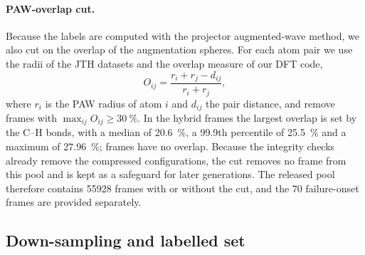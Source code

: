 \paragraph{PAW-overlap cut.} Because the labels are computed with the projector augmented-wave
method,\cite{Blochl1994PAW} we also cut on the overlap of the augmentation spheres. For each atom pair
we use the radii of the JTH datasets\cite{Jollet2014CPC} and the overlap measure of our DFT code,
\begin{equation}
  O_{ij} = \frac{r_i + r_j - d_{ij}}{r_i + r_j},
\end{equation}
where $r_i$ is the PAW radius of atom $i$ and $d_{ij}$ the pair distance, and remove frames with
$\max_{ij}O_{ij} \geq \SI{30}{\percent}$. In the hybrid frames the largest overlap is set by the C--H
bonds, with a median of \SI{20.6}{\percent}, a 99.9th percentile of \SI{25.5}{\percent} and a maximum
of \SI{27.96}{\percent}; \CsSnI{} frames have no overlap. Because the integrity checks already remove
the compressed configurations, the cut removes no frame from this pool and is kept as a safeguard for
later generations. The released pool therefore contains \num{55928} frames with or without the cut,
and the 70 failure-onset frames are provided separately.

\subsection{Down-sampling and labelled set}
\label{sec:configgen:down}
